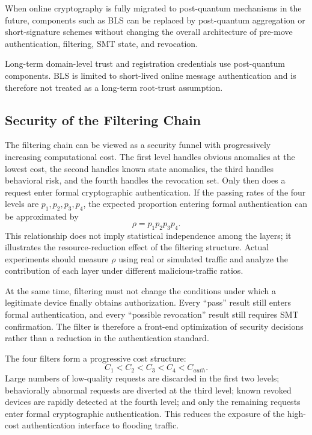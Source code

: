 \documentclass[lettersize,journal]{IEEEtran}
\begin{document}
	When online cryptography is fully migrated to post-quantum mechanisms in the future, components such as BLS can be replaced by post-quantum aggregation or short-signature schemes without changing the overall architecture of pre-move authentication, filtering, SMT state, and revocation.
	
	Long-term domain-level trust and registration credentials use post-quantum components. BLS is limited to short-lived online message authentication and is therefore not treated as a long-term root-trust assumption.
	
	\subsection{Security of the Filtering Chain}
	
	The filtering chain can be viewed as a security funnel with progressively increasing computational cost. The first level handles obvious anomalies at the lowest cost, the second handles known state anomalies, the third handles behavioral risk, and the fourth handles the revocation set. Only then does a request enter formal cryptographic authentication. If the passing rates of the four levels are $p_1,p_2,p_3,p_4$, the expected proportion entering formal authentication can be approximated by
	\begin{equation}
		\rho=p_1p_2p_3p_4.
	\end{equation}
	This relationship does not imply statistical independence among the layers; it illustrates the resource-reduction effect of the filtering structure. Actual experiments should measure $\rho$ using real or simulated traffic and analyze the contribution of each layer under different malicious-traffic ratios.
	
	At the same time, filtering must not change the conditions under which a legitimate device finally obtains authorization. Every ``pass'' result still enters formal authentication, and every ``possible revocation'' result still requires SMT confirmation. The filter is therefore a front-end optimization of security decisions rather than a reduction in the authentication standard.
	
	The four filters form a progressive cost structure:
	\begin{equation}
		C_1<C_2<C_3<C_4<C_{auth}.
	\end{equation}
	Large numbers of low-quality requests are discarded in the first two levels; behaviorally abnormal requests are diverted at the third level; known revoked devices are rapidly detected at the fourth level; and only the remaining requests enter formal cryptographic authentication. This reduces the exposure of the high-cost authentication interface to flooding traffic.
	
\end{document}
